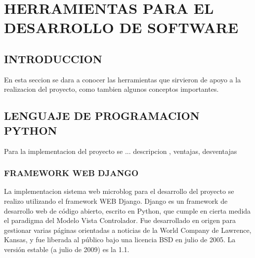 

%
\chapter{HERRAMIENTAS PARA EL DESARROLLO DE SOFTWARE}
\section{INTRODUCCION}
En esta seccion se dara a conocer las herramientas que sirvieron de apoyo a la realizacion del proyecto, como tambien algunos conceptos importantes.

\section{LENGUAJE DE PROGRAMACION PYTHON}
Para la implementacion del proyecto se ...
descripcion , ventajas, desventajas

\subsection{FRAMEWORK WEB DJANGO}
La implementacion sistema web microblog para el desarrollo del proyecto se realizo utilizando el framework WEB Django. 
Django es un framework de desarrollo web de código abierto, escrito en Python, que cumple en cierta medida el paradigma del Modelo Vista Controlador. Fue desarrollado en origen para gestionar varias páginas orientadas a noticias de la World Company de Lawrence, Kansas, y fue liberada al público bajo una licencia BSD en julio de 2005. La versión estable (a julio de 2009) es la 1.1.

